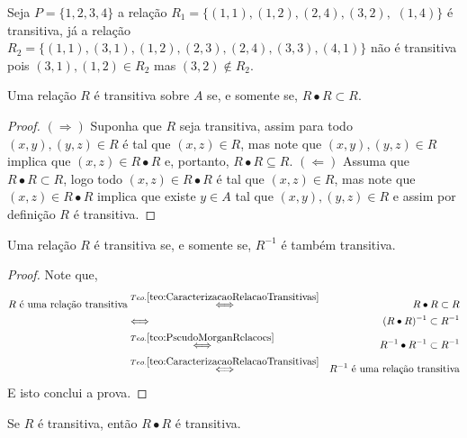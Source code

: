 \begin{exemplo}
	Seja $P = \{1, 2, 3, 4\}$ a relação $R_1 = \{(1, 1), (1, 2), (2, 4), (3, 2),$ $(1, 4)\}$ é transitiva, já a relação $R_2 = \{(1, 1), (3, 1), (1, 2), (2,3), (2, 4), (3, 3), (4, 1)\}$ não é transitiva pois $(3, 1), (1, 2) \in R_2$ mas $(3, 2) \notin R_2$.
\end{exemplo}

\begin{teorema}\label{teo:CaracterizacaoRelacaoTransitivas}
	Uma relação $R$ é transitiva sobre $A$ se, e somente se, $R \bullet R \subset R$.
\end{teorema}

\begin{proof}
	$(\Rightarrow)$ Suponha que $R$ seja transitiva, assim para todo $(x, y), (y, z) \in R$ é tal que $(x, z) \in R$, mas note que $(x, y), (y, z) \in R$ implica que $(x, z) \in R \bullet R$ e, portanto, $R \bullet R \subseteq R$. $(\Leftarrow)$ Assuma que $R \bullet R \subset R$, logo todo $(x, z) \in R \bullet R$ é tal que $(x, z) \in R$, mas note que $(x, z) \in R \bullet R$ implica que existe $y \in A$ tal que $(x, y), (y, z) \in R$ e assim por definição $R$ é transitiva. 
\end{proof}

\begin{corolario}
	Uma relação $R$ é transitiva se, e somente se, $R^{-1}$ é também transitiva.
\end{corolario}

\begin{proof}
	Note que,
	\begin{eqnarray*}
		R \text{ é uma relação transitiva} & \stackrel{Teo. \ref{teo:CaracterizacaoRelacaoTransitivas}}{\Longleftrightarrow }& R \bullet R \subset R\\
		& \stackrel{ }{\Longleftrightarrow} & (R \bullet R)^{-1} \subset R^{-1}\\
		& \stackrel{Teo. \ref{teo:PseudoMorganRelacoes}}{\Longleftrightarrow} & R^{-1} \bullet R^{-1} \subset R^{-1}\\
		&  \stackrel{Teo. \ref{teo:CaracterizacaoRelacaoTransitivas}}{\Longleftrightarrow } & R^{-1} \text{ é uma relação transitiva}
	\end{eqnarray*}
	E isto conclui a prova.
\end{proof}

\begin{teorema}
	Se $R$ é transitiva, então $R \bullet R$ é transitiva.
\end{teorema}

